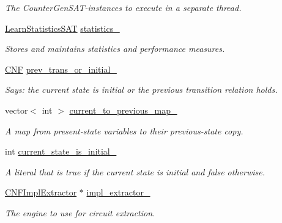 \begin{DoxyCompactItemize}
\begin{DoxyCompactList}\small\item\em The Counter\-Gen\-S\-A\-T-\/instances to execute in a separate thread. \end{DoxyCompactList}\item 
\hyperlink{classLearnStatisticsSAT}{Learn\-Statistics\-S\-A\-T} \hyperlink{classParallelLearner_abfb2e28ec1a0f8775d3f14f75415a8bd}{statistics\-\_\-}
\begin{DoxyCompactList}\small\item\em Stores and maintains statistics and performance measures. \end{DoxyCompactList}\item 
\hyperlink{classCNF}{C\-N\-F} \hyperlink{classParallelLearner_ac73d9338262855f61f23a65d1df0647c}{prev\-\_\-trans\-\_\-or\-\_\-initial\-\_\-}
\begin{DoxyCompactList}\small\item\em Says\-: the current state is initial or the previous transition relation holds. \end{DoxyCompactList}\item 
vector$<$ int $>$ \hyperlink{classParallelLearner_a6f8dfda6aa8640345057023ed85882b9}{current\-\_\-to\-\_\-previous\-\_\-map\-\_\-}
\begin{DoxyCompactList}\small\item\em A map from present-\/state variables to their previous-\/state copy. \end{DoxyCompactList}\item 
int \hyperlink{classParallelLearner_ae9293a4afd3c52690bcac2ad03884121}{current\-\_\-state\-\_\-is\-\_\-initial\-\_\-}
\begin{DoxyCompactList}\small\item\em A literal that is true if the current state is initial and false otherwise. \end{DoxyCompactList}\item 
\hyperlink{classCNFImplExtractor}{C\-N\-F\-Impl\-Extractor} $\ast$ \hyperlink{classParallelLearner_a58b6113b54eb7c91bbf15546d575f5e8}{impl\-\_\-extractor\-\_\-}
\begin{DoxyCompactList}\small\item\em The engine to use for circuit extraction. \end{DoxyCompactList}\end{DoxyCompactItemize}
